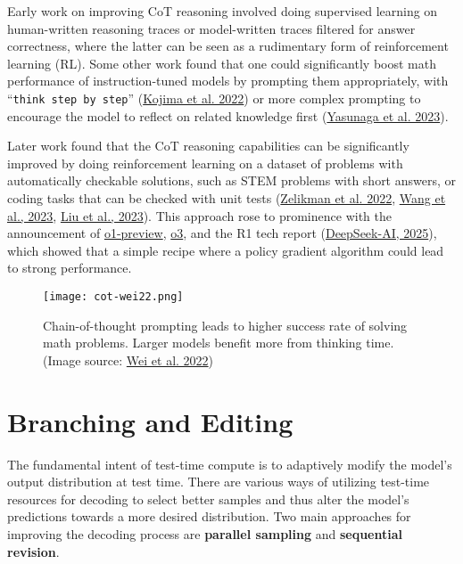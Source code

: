 \documentclass[12pt]{article}
\begin{document}
Early work on improving CoT reasoning involved doing supervised learning on human-written reasoning traces or model-written traces filtered for answer correctness, where the latter can be seen as a rudimentary form of reinforcement learning (RL). Some other work found that one could significantly boost math performance of instruction-tuned models by prompting them appropriately, with ``\texttt{think step by step}'' (\href{https://arxiv.org/abs/2205.11916}{Kojima et al. 2022}) or more complex prompting to encourage the model to reflect on related knowledge first (\href{https://arxiv.org/abs/2310.01714}{Yasunaga et al. 2023}).

Later work found that the CoT reasoning capabilities can be significantly improved by doing reinforcement learning on a dataset of problems with automatically checkable solutions, such as STEM problems with short answers, or coding tasks that can be checked with unit tests (\href{https://arxiv.org/abs/2203.14465}{Zelikman et al. 2022}, \href{https://arxiv.org/abs/2312.08935}{Wang et al., 2023}, \href{https://arxiv.org/abs/2310.10047}{Liu et al., 2023}). This approach rose to prominence with the announcement of \href{https://openai.com/index/learning-to-reason-with-llms/}{o1-preview}, \href{https://openai.com/index/introducing-o3-and-o4-mini/}{o3}, and the R1 tech report (\href{https://arxiv.org/abs/2501.12948}{DeepSeek-AI, 2025}), which showed that a simple recipe where a policy gradient algorithm could lead to strong performance.

\begin{figure}[h]
    \centering
    \texttt{[image: cot-wei22.png]}
    \caption{Chain-of-thought prompting leads to higher success rate of solving math problems. Larger models benefit more from thinking time. (Image source: \href{https://arxiv.org/abs/2201.11903}{Wei et al. 2022})}
\end{figure}

\section{Branching and Editing}

The fundamental intent of test-time compute is to adaptively modify the model’s output distribution at test time. There are various ways of utilizing test-time resources for decoding to select better samples and thus alter the model’s predictions towards a more desired distribution. Two main approaches for improving the decoding process are \textbf{parallel sampling} and \textbf{sequential revision}.
\end{document}
